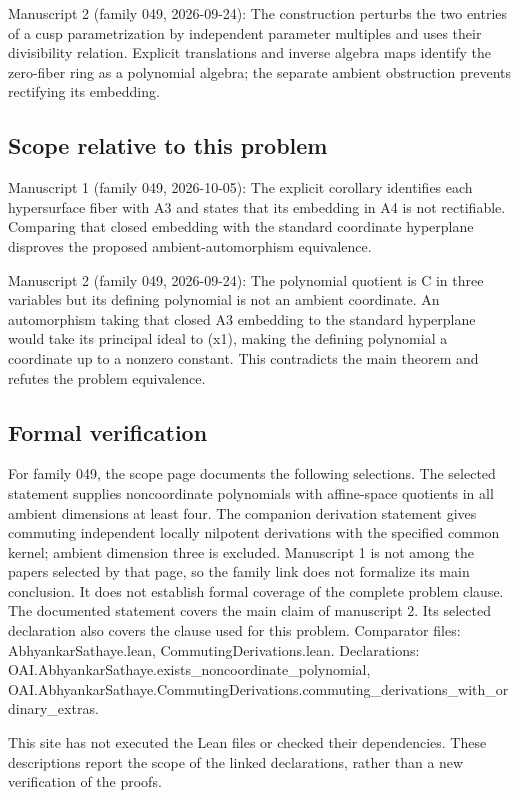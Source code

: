 \documentclass[11pt]{article}
\begin{document}
Manuscript 2 (family 049, 2026-09-24): The construction perturbs the two entries of a cusp parametrization by independent parameter multiples and uses their divisibility relation. Explicit translations and inverse algebra maps identify the zero-fiber ring as a polynomial algebra; the separate ambient obstruction prevents rectifying its embedding.

\subsection{Scope relative to this problem}
Manuscript 1 (family 049, 2026-10-05): The explicit corollary identifies each hypersurface fiber with A3 and states that its embedding in A4 is not rectifiable. Comparing that closed embedding with the standard coordinate hyperplane disproves the proposed ambient-automorphism equivalence.

Manuscript 2 (family 049, 2026-09-24): The polynomial quotient is C in three variables but its defining polynomial is not an ambient coordinate. An automorphism taking that closed A3 embedding to the standard hyperplane would take its principal ideal to (x1), making the defining polynomial a coordinate up to a nonzero constant. This contradicts the main theorem and refutes the problem equivalence.

\subsection{Formal verification}
For family 049, the scope page documents the following selections. The selected statement supplies noncoordinate polynomials with affine-space quotients in all ambient dimensions at least four. The companion derivation statement gives commuting independent locally nilpotent derivations with the specified common kernel; ambient dimension three is excluded. Manuscript 1 is not among the papers selected by that page, so the family link does not formalize its main conclusion. It does not establish formal coverage of the complete problem clause. The documented statement covers the main claim of manuscript 2. Its selected declaration also covers the clause used for this problem. Comparator files: AbhyankarSathaye.lean, CommutingDerivations.lean. Declarations: OAI.AbhyankarSathaye.exists\_noncoordinate\_polynomial, OAI.AbhyankarSathaye.CommutingDerivations.commuting\_derivations\_with\_ordinary\_extras.

This site has not executed the Lean files or checked their dependencies. These descriptions report the scope of the linked declarations, rather than a new verification of the proofs.
\end{document}
